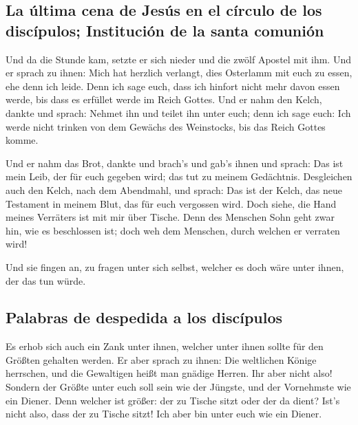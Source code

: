 \hypertarget{la-uxfaltima-cena-de-jesuxfas-en-el-cuxedrculo-de-los-discuxedpulos-instituciuxf3n-de-la-santa-comuniuxf3n}{%
\subsection{La última cena de Jesús en el círculo de los discípulos;
Institución de la santa
comunión}\label{la-uxfaltima-cena-de-jesuxfas-en-el-cuxedrculo-de-los-discuxedpulos-instituciuxf3n-de-la-santa-comuniuxf3n}}

 Und da die Stunde kam, setzte er sich nieder und die
zwölf Apostel mit ihm.  Und er sprach zu ihnen: Mich hat
herzlich verlangt, dies Osterlamm mit euch zu essen, ehe denn ich leide.
 Denn ich sage euch, dass ich hinfort nicht mehr davon
essen werde, bis dass es erfüllet werde im Reich Gottes. 
Und er nahm den Kelch, dankte und sprach: Nehmet ihn und teilet ihn
unter euch;  denn ich sage euch: Ich werde nicht trinken
von dem Gewächs des Weinstocks, bis das Reich Gottes komme.

 Und er nahm das Brot, dankte und brach's und gab's ihnen
und sprach: Das ist mein Leib, der für euch gegeben wird; das tut zu
meinem Gedächtnis.  Desgleichen auch den Kelch, nach dem
Abendmahl, und sprach: Das ist der Kelch, das neue Testament in meinem
Blut, das für euch vergossen wird.  Doch siehe, die Hand
meines Verräters ist mit mir über Tische.  Denn des
Menschen Sohn geht zwar hin, wie es beschlossen ist; doch weh dem
Menschen, durch welchen er verraten wird!

 Und sie fingen an, zu fragen unter sich selbst, welcher
es doch wäre unter ihnen, der das tun würde.

\hypertarget{palabras-de-despedida-a-los-discuxedpulos}{%
\subsection{Palabras de despedida a los
discípulos}\label{palabras-de-despedida-a-los-discuxedpulos}}

 Es erhob sich auch ein Zank unter ihnen, welcher unter
ihnen sollte für den Größten gehalten werden.  Er aber
sprach zu ihnen: Die weltlichen Könige herrschen, und die Gewaltigen
heißt man gnädige Herren.  Ihr aber nicht also! Sondern
der Größte unter euch soll sein wie der Jüngste, und der Vornehmste wie
ein Diener.  Denn welcher ist größer: der zu Tische sitzt
oder der da dient? Ist's nicht also, dass der zu Tische sitzt! Ich aber
bin unter euch wie ein Diener.

